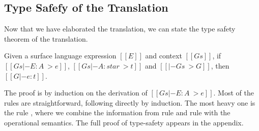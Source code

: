 \subsection{Type Safefy of the Translation}

Now that we have elaborated the translation, we can state the
type safety theorem of the translation.

\begin{thm}
Given a surface language expression $[[E]]$ and context $[[Gs]]$, 
if $[[Gs |- E:A ~> e]]$, $[[Gs |- A:star ~> t]]$ and $[[|- Gs ~> G]]$, then
$[[G |- e:t]]$.
\end{thm}

The proof is by induction on the derivation of $[[Gs |- E : A ~> e]]$.
Most of the rules are straightforward, following directly by
induction. The most heavy one is the rule , where we
combine the information from rule  and rule
 with the operational semantics. The full proof of
type-safety appears in the appendix.

